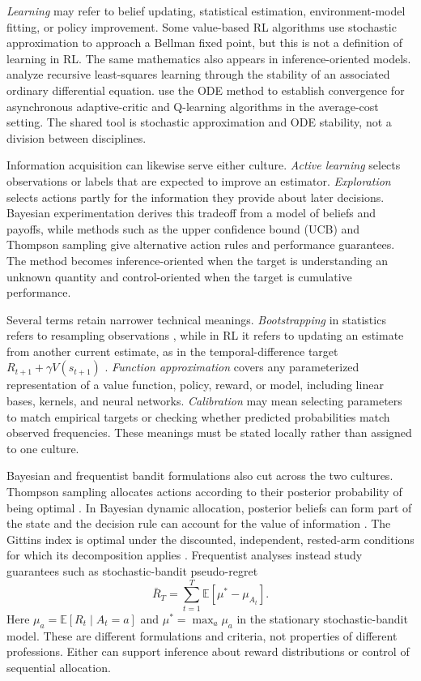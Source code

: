 \emph{Learning} may refer to belief updating, statistical estimation, environment-model fitting, or policy improvement. Some value-based RL algorithms use stochastic approximation to approach a Bellman fixed point, but this is not a definition of learning in RL. The same mathematics also appears in inference-oriented models. \citet{MarcetSargent1989} analyze recursive least-squares learning through the stability of an associated ordinary differential equation. \citet{borkar2000} use the ODE method to establish convergence for asynchronous adaptive-critic and Q-learning algorithms in the average-cost setting. The shared tool is stochastic approximation and ODE stability, not a division between disciplines.

Information acquisition can likewise serve either culture. \emph{Active learning} selects observations or labels that are expected to improve an estimator. \emph{Exploration} selects actions partly for the information they provide about later decisions. Bayesian experimentation derives this tradeoff from a model of beliefs and payoffs, while methods such as the upper confidence bound (UCB) and Thompson sampling give alternative action rules and performance guarantees. The method becomes inference-oriented when the target is understanding an unknown quantity and control-oriented when the target is cumulative performance.

Several terms retain narrower technical meanings. \emph{Bootstrapping} in statistics refers to resampling observations \citep{Efron1979}, while in RL it refers to updating an estimate from another current estimate, as in the temporal-difference target $R_{t+1}+\gamma V(s_{t+1})$ \citep{sutton1988}. \emph{Function approximation} covers any parameterized representation of a value function, policy, reward, or model, including linear bases, kernels, and neural networks. \emph{Calibration} may mean selecting parameters to match empirical targets or checking whether predicted probabilities match observed frequencies. These meanings must be stated locally rather than assigned to one culture.

Bayesian and frequentist bandit formulations also cut across the two cultures. Thompson sampling allocates actions according to their posterior probability of being optimal \citep{Thompson1933}. In Bayesian dynamic allocation, posterior beliefs can form part of the state and the decision rule can account for the value of information \citep{Rothschild1974}. The Gittins index is optimal under the discounted, independent, rested-arm conditions for which its decomposition applies \citep{Gittins1979}. Frequentist analyses instead study guarantees such as stochastic-bandit pseudo-regret
\[
\bar{R}_T=\sum_{t=1}^{T}\mathbb{E}[\mu^*-\mu_{A_t}].
\]
Here $\mu_a=\mathbb{E}[R_t\mid A_t=a]$ and $\mu^*=\max_a\mu_a$ in the stationary stochastic-bandit model.
These are different formulations and criteria, not properties of different professions. Either can support inference about reward distributions or control of sequential allocation.

